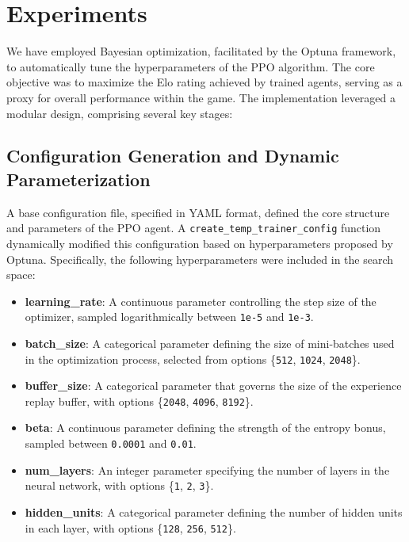 \documentclass{LSkill}
\begin{document}
\section{Experiments}

We have employed Bayesian optimization, facilitated by the Optuna framework, to automatically tune the hyperparameters of the PPO algorithm. The core objective was to maximize the Elo rating achieved by trained agents, serving as a proxy for overall performance within the game. The implementation leveraged a modular design, comprising several key stages:

\subsection{Configuration Generation and Dynamic Parameterization}

A base configuration file, specified in YAML format, defined the core structure and parameters of the PPO agent. A \texttt{create\_temp\_trainer\_config} function dynamically modified this configuration based on hyperparameters proposed by Optuna. Specifically, the following hyperparameters were included in the search space:

\begin{itemize}
    \item \textbf{learning\_rate}: A continuous parameter controlling the step size of the optimizer, sampled logarithmically between \texttt{1e-5} and \texttt{1e-3}.
    \item \textbf{batch\_size}: A categorical parameter defining the size of mini-batches used in the optimization process, selected from options \{\texttt{512}, \texttt{1024}, \texttt{2048}\}.
    \item \textbf{buffer\_size}: A categorical parameter that governs the size of the experience replay buffer, with options \{\texttt{2048}, \texttt{4096}, \texttt{8192}\}.
    \item \textbf{beta}: A continuous parameter defining the strength of the entropy bonus, sampled between \texttt{0.0001} and \texttt{0.01}.
    \item \textbf{num\_layers}: An integer parameter specifying the number of layers in the neural network, with options \{\texttt{1}, \texttt{2}, \texttt{3}\}.
    \item \textbf{hidden\_units}: A categorical parameter defining the number of hidden units in each layer, with options \{\texttt{128}, \texttt{256}, \texttt{512}\}.
\end{itemize}
\end{document}
